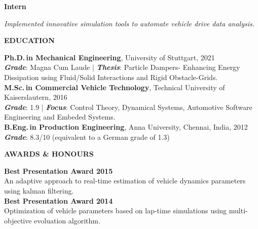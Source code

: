 \documentclass[a4paper,10pt]{article}
\begin{document}
\noindent
\colorbox{gray!40}{%
    \parbox{0.99\textwidth}{%
        \textcolor{highlightcolor}{\textbf{Intern}}
    }%
}

\vspace{0.2cm}
\noindent
\textit{Implemented innovative simulation tools to automate vehicle drive data analysis.}

\newpage

\noindent{\rule{\linewidth}{1.4pt}}
\noindent \textbf{EDUCATION}

\vspace{-0.1cm}
\noindent{\rule{\linewidth}{0.01cm}}

\noindent \textbf{Ph.D.\,in Mechanical Engineering}, University of Stuttgart, 2021\\
\noindent \textcolor{highlightcolor}{\textbf{\textit{Grade}}}: Magna Cum Laude $\vert$ \textcolor{highlightcolor}{\textbf{\textit{Thesis}}}: {Particle Dampers- Enhancing Energy Dissipation using Fluid/Solid Interactions and Rigid Obstacle-Grids.}\\

\noindent \textbf{M.Sc.\,in Commercial Vehicle Technology}, Technical University of Kaiserslautern, 2016\\
\noindent \textcolor{highlightcolor}{\textbf{\textit{Grade}}}: 1.9 $\vert$ \textcolor{highlightcolor}{\textbf{\textit{Focus}}}: Control Theory, Dynamical Systems, Automotive Software Engineering and Embeded Systems.\\

\noindent \textbf{B.Eng.\,in Production Engineering}, Anna University, Chennai, India, 2012\\
\noindent \textcolor{highlightcolor}{\textbf{\textit{Grade}}}: 8.3/10 (equivalent to a German grade of 1.3)

\noindent{\rule{\linewidth}{1.4pt}}
\textbf{AWARDS \& HONOURS}

\vspace{-0.1cm}
\noindent{\rule{\linewidth}{0.01cm}}

\vspace{0.1cm}
\noindent \textbf{Best Presentation Award 2015}\\
An adaptive approach to real-time estimation of vehicle dynamics parameters using kalman filtering.\\

\noindent \textbf{Best Presentation Award 2014}\\
Optimization of vehicle parameters based on lap-time simulations using multi-objective evoluation algorithm.
\end{document}
